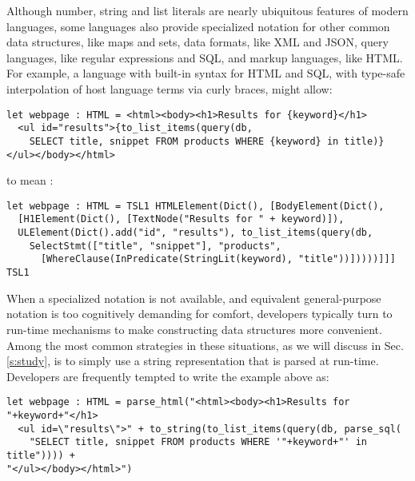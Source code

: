 Although number, string and list literals are nearly ubiquitous features of modern languages, some languages also  provide specialized notation for other common data structures, like maps and sets, data formats, like XML and JSON, query languages, like regular expressions and SQL, and markup languages, like HTML. For example, a language with built-in syntax for HTML and SQL, with type-safe interpolation of host language terms via curly braces, might allow:
\begin{lstlisting}
let webpage : HTML = <html><body><h1>Results for {keyword}</h1>
  <ul id="results">{to_list_items(query(db, 
    SELECT title, snippet FROM products WHERE {keyword} in title)}
</ul></body></html>
\end{lstlisting}
to mean :
\begin{lstlisting}
let webpage : HTML = TSL1 HTMLElement(Dict(), [BodyElement(Dict(),
  [H1Element(Dict(), [TextNode("Results for " + keyword)]), 
  ULElement(Dict().add("id", "results"), to_list_items(query(db, 
    SelectStmt(["title", "snippet"], "products", 
      [WhereClause(InPredicate(StringLit(keyword), "title"))]))))]]] TSL1
\end{lstlisting}

When a specialized notation is not available, and equivalent general-purpose notation is too cognitively demanding for comfort, developers typically turn to run-time mechanisms to make constructing data structures more convenient. Among the most common strategies in these situations, as we will discuss in Sec. \ref{s:study}, is to simply use a string representation that is parsed at run-time. Developers are frequently  tempted to write the example above as:
\begin{lstlisting}
let webpage : HTML = parse_html("<html><body><h1>Results for "+keyword+"</h1>
  <ul id=\"results\">" + to_string(to_list_items(query(db, parse_sql(
  	"SELECT title, snippet FROM products WHERE '"+keyword+"' in title")))) + 
"</ul></body></html>")
\end{lstlisting}

